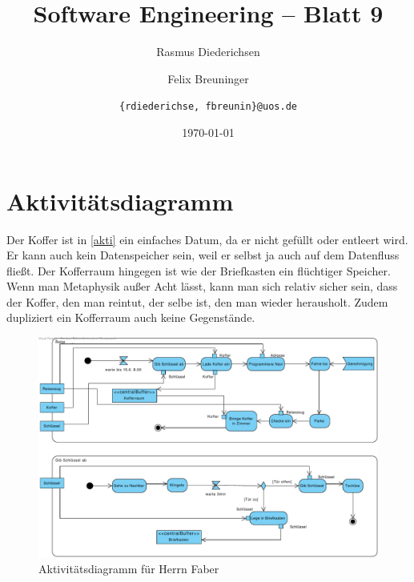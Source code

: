 \documentclass{scrartcl}
\title{\rmfamily Software Engineering -- Blatt 9}
\author{Rasmus Diederichsen \and Felix Breuninger\and 
   \texttt{\{rdiederichse, fbreunin\}@uos.de}
}
\date{\today}
\begin{document}
\selectfont
\maketitle

\section{Aktivitätsdiagramm}

Der Koffer ist in \autoref{akti} ein einfaches Datum, da er nicht gefüllt oder entleert wird.
Er kann auch kein Datenspeicher sein, weil er selbst ja auch auf dem Datenfluss
fließt. Der Kofferraum hingegen ist wie der Briefkasten ein flüchtiger Speicher.
Wenn man Metaphysik außer Acht lässt, kann man sich relativ sicher sein, dass
der Koffer, den man reintut, der selbe ist, den man wieder herausholt. Zudem
dupliziert ein Kofferraum auch keine Gegenstände.

\begin{figure}
   {\centering      
      \includegraphics[width=\linewidth]{Reise.pdf}
      \caption{Aktivitätsdiagramm für Herrn Faber}
   \label{akti}}
\end{figure}
\end{document}
